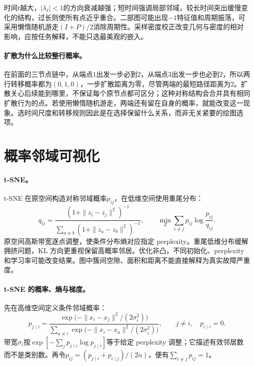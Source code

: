 时间$t$越大，$|\lambda_\ell|<1$的方向衰减越强；短时间强调局部邻域，较长时间突出缓慢变化的结构，过长则使所有点近乎重合。二部图可能出现$-1$特征值和周期振荡，可采用懒惰随机游走$(I+P)/2$消除周期性。采样密度校正改变几何与密度的相对影响，应按任务解释，不能只选最美观的嵌入。

\paragraph{扩散为什么比较整行概率。}
在前面的三节点链中，从端点$1$出发一步必到$2$，从端点$3$出发一步也必到$2$，所以两行转移概率都为$(0,1,0)$，一步扩散距离为零，尽管两端的最短路径距离为$2$。扩散关心后续能到哪里，不保证每个原节点都可区分；这种对称结构会合并具有相同扩散行为的点。若使用懒惰随机游走，两端还有留在自身的概率，就能改变这一现象。选时间尺度和转移规则因此是在选择保留什么关系，而非无关紧要的绘图选项。

\section{概率邻域可视化}
\paragraph{t-SNE。}
t-SNE 在原空间构造对称邻域概率$p_{ij}$，在低维空间使用重尾分布\cite{vandermaaten2008tsne}：
\begin{equation}
 q_{ij}=\frac{(1+\|z_i-z_j\|^2)^{-1}}
 {\sum_{a\ne b}(1+\|z_a-z_b\|^2)^{-1}},\qquad
 \min_Z\sum_{i\ne j}p_{ij}\log\frac{p_{ij}}{q_{ij}}.
\end{equation}
原空间高斯带宽逐点调整，使条件分布熵对应指定 perplexity。重尾低维分布缓解拥挤问题，KL 方向更重视保留高概率邻居。优化非凸，不同初始化、perplexity 和学习率可能改变结果。图中簇间空隙、面积和距离不能直接解释为真实故障严重度。

\paragraph{t-SNE 的概率、熵与梯度。}
先在高维空间定义条件邻域概率：
\begin{equation}
 p_{j\mid i}=
 \frac{\exp\bigl(-\|x_i-x_j\|^2/(2\sigma_i^2)\bigr)}
 {\sum_{a\ne i}\exp\bigl(-\|x_i-x_a\|^2/(2\sigma_i^2)\bigr)},
 \qquad j\ne i,\quad p_{i\mid i}=0.
\end{equation}
带宽$\sigma_i$按$\exp[-\sum_jp_{j\mid i}\log p_{j\mid i}]$等于给定 perplexity 调整；它描述有效邻居数而不是类别数。再令$p_{ij}=(p_{j\mid i}+p_{i\mid j})/(2n)$，便有$\sum_{i\ne j}p_{ij}=1$。

